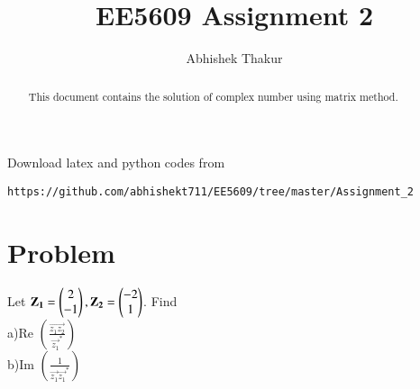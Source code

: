\documentclass[journal,12pt,twocolumn]{IEEEtran}
\begin{document}
     \def\rightbox#1{\makebox[0in][r]{#1}}
     \def\centbox#1{\makebox[0in]{#1}}
     \def\topbox#1{\raisebox{-\baselineskip}[0in][0in]{#1}}
     \def\midbox#1{\raisebox{-0.5\baselineskip}[0in][0in]{#1}}
\vspace{3cm}
\title{EE5609 Assignment 2}
\author{Abhishek Thakur}
\maketitle
\newpage
\bigskip
\renewcommand{\thefigure}{\theenumi}
\renewcommand{\thetable}{\theenumi}
\begin{abstract}
This document contains the solution of complex number using matrix method.
\end{abstract}
Download latex and python codes from 
\begin{lstlisting}
https://github.com/abhishekt711/EE5609/tree/master/Assignment_2
\end{lstlisting}
%
\section{Problem}
Let $\mathbf{Z_1}=\begin{pmatrix}2\\ -1\end{pmatrix} ,  \mathbf{Z_2}=\begin{pmatrix}-2\\ 1\end{pmatrix}$. Find\\
a)Re $\left(\frac{\vec{z_1z_2}}{\vec{z_1}^*}\right)$\\
b)Im $\left(\frac{1}{\vec{z_1}\vec{z_1}^*}\right)$
\end{document}

